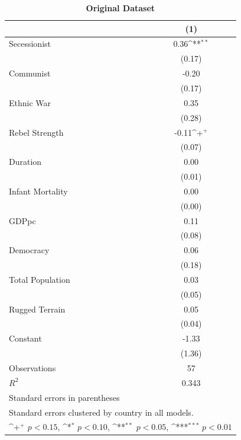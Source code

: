 \documentclass[12pt, letterpaper]{article}
\begin{document}
\newpage
\begin{table}[htbp]\centering
\def\sym#1{\ifmmode^{#1}\else\(^{#1}\)\fi}
\begin{small}
\renewcommand\thetable{A.\Roman{table}}
\makeatletter
\def\myrow{}
\CT@everycr{\noalign{%
\global\let\CT@row@color\relax
\stepcounter{mym7}%
\ifnum\value{mym7}=2
  \gdef\myrow{\rowcolor{gray!50}}
\else\ifnum\value{mym7}=4
  \gdef\myrow{}
\fi\fi
}\myrow}
\caption{\textbf{Original Dataset}}
\label{table:original}
\begin{tabular}{l*{1}{c}}
\hline\hline
                    &\multicolumn{1}{c}{(1)}\\
\hline
Secessionist       &        0.36\sym{**} \\
                    &      (0.17)         \\
Communist     &       -0.20         \\
                    &      (0.17)         \\
Ethnic War           &        0.35         \\
                    &      (0.28)         \\
Rebel Strength        &       -0.11\sym{+}  \\
                    &      (0.07)         \\
Duration                 &        0.00         \\
                    &      (0.01)         \\
Infant Mortality        &        0.00         \\
                    &      (0.00)         \\
GDPpc      &        0.11         \\
                    &      (0.08)         \\
Democracy   &        0.06         \\
                    &      (0.18)         \\
Total Population   &        0.03         \\
                    &      (0.05)         \\
Rugged Terrain       &        0.05         \\
                    &      (0.04)         \\
Constant            &       -1.33         \\
                    &      (1.36)         \\
\hline
Observations        &          57         \\
\(R^{2}\)           &       0.343         \\
\hline\hline
\multicolumn{2}{l}{\footnotesize Standard errors in parentheses}\\
\multicolumn{2}{l}{\footnotesize Standard errors clustered by country in all models.}\\
\multicolumn{2}{l}{\footnotesize \sym{+} \(p<0.15\), \sym{*} \(p<0.10\), \sym{**} \(p<0.05\), \sym{***} \(p<0.01\)}\\
\end{tabular}
\end{small}
\end{table}
\end{document}
